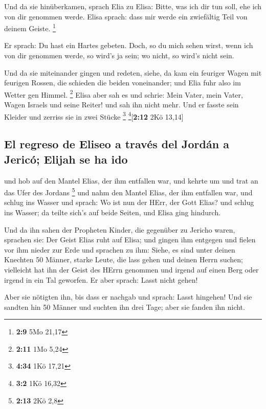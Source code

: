  Und da sie hinüberkamen, sprach Elia zu Elisa: Bitte, was
ich dir tun soll, ehe ich von dir genommen werde. Elisa sprach: dass mir
werde ein zwiefältig Teil von deinem Geiste. \footnote{\textbf{2:9} 5Mo
  21,17}

 Er sprach: Du hast ein Hartes gebeten. Doch, so du mich
sehen wirst, wenn ich von dir genommen werde, so wird's ja sein; wo
nicht, so wird's nicht sein.

 Und da sie miteinander gingen und redeten, siehe, da kam
ein feuriger Wagen mit feurigen Rossen, die schieden die beiden
voneinander; und Elia fuhr also im Wetter gen Himmel. \footnote{\textbf{2:11}
  1Mo 5,24}  Elisa aber sah es und schrie: Mein Vater,
mein Vater, Wagen Israels und seine Reiter! und sah ihn nicht mehr. Und
er fasste sein Kleider und zerriss sie in zwei Stücke \footnote{\textbf{4:34}
  1Kö 17,21} \footnote{\textbf{3:2} 1Kö 16,32}{[}\textbf{2:12} 2Kö
13,14{]}

\hypertarget{el-regreso-de-eliseo-a-travuxe9s-del-jorduxe1n-a-jericuxf3-elijah-se-ha-ido}{%
\subsection{El regreso de Eliseo a través del Jordán a Jericó; Elijah se
ha
ido}\label{el-regreso-de-eliseo-a-travuxe9s-del-jorduxe1n-a-jericuxf3-elijah-se-ha-ido}}

 und hob auf den Mantel Elias, der ihm entfallen war, und
kehrte um und trat an das Ufer des Jordans \footnote{\textbf{2:13} 2Kö
  2,8}  und nahm den Mantel Elias, der ihm entfallen war,
und schlug ins Wasser und sprach: Wo ist nun der HErr, der Gott Elias?
und schlug ins Wasser; da teilte sich's auf beide Seiten, und Elisa ging
hindurch.

 Und da ihn sahen der Propheten Kinder, die gegenüber zu
Jericho waren, sprachen sie: Der Geist Elias ruht auf Elisa; und gingen
ihm entgegen und fielen vor ihm nieder zur Erde  und
sprachen zu ihm: Siehe, es sind unter deinen Knechten 50 Männer, starke
Leute, die lass gehen und deinen Herrn suchen; vielleicht hat ihn der
Geist des HErrn genommen und irgend auf einen Berg oder irgend in ein
Tal geworfen. Er aber sprach: Lasst nicht gehen!

 Aber sie nötigten ihn, bis dass er nachgab und sprach:
Lasst hingehen! Und sie sandten hin 50 Männer und suchten ihn drei Tage;
aber sie fanden ihn nicht.

